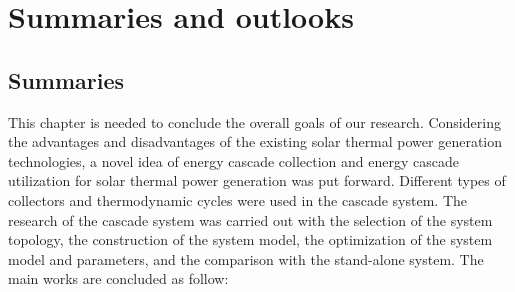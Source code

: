 \chapter{Summaries and outlooks}
\label{cha:sio}
\section{Summaries}

This chapter is needed to conclude the overall goals of our research. Considering the advantages and disadvantages of the existing solar thermal power generation technologies, a novel idea of energy cascade collection and energy cascade utilization for solar thermal power generation was put forward. Different types of collectors and thermodynamic cycles were used in the cascade system. The research of the cascade system was carried out with the selection of the system topology, the construction of the system model, the optimization of the system model and parameters, and the comparison with the stand-alone system. The main works are concluded as follow:

